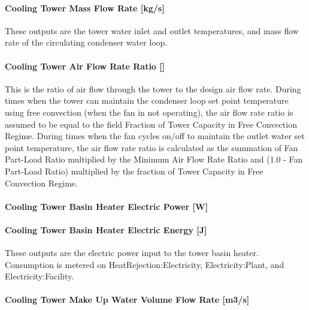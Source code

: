\paragraph{Cooling Tower Mass Flow Rate {[}kg/s{]}}\label{cooling-tower-mass-flow-rate-kgs-3}

These outputs are the tower water inlet and outlet temperatures, and mass flow rate of the circulating condenser water loop.

\paragraph{Cooling Tower Air Flow Rate Ratio {[]}}\label{cooling-tower-air-flow-rate-ratio}

This is the ratio of air flow through the tower to the design air flow rate. During times when the tower can maintain the condenser loop set point temperature using free convection (when the fan in not operating), the air flow rate ratio is assumed to be equal to the field Fraction of Tower Capacity in Free Convection Regime. During times when the fan cycles on/off to maintain the outlet water set point temperature, the air flow rate ratio is calculated as the summation of Fan Part-Load Ratio multiplied by the Minimum Air Flow Rate Ratio and (1.0 - Fan Part-Load Ratio) multiplied by the fraction of Tower Capacity in Free Convection Regime.

\paragraph{Cooling Tower Basin Heater Electric Power {[}W{]}}\label{cooling-tower-basin-heater-electric-power-w-3}

\paragraph{Cooling Tower Basin Heater Electric Energy {[}J{]}}\label{cooling-tower-basin-heater-electric-energy-j-3}

These outputs are the electric power input to the tower basin heater. Consumption is metered on HeatRejection:Electricity, Electricity:Plant, and Electricity:Facility.

\paragraph{Cooling Tower Make Up Water Volume Flow Rate {[}m3/s{]}}\label{cooling-tower-make-up-water-volume-flow-rate-m3s-3}

